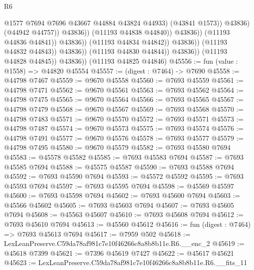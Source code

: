 \begin{lexlean}{R6}
\begin{coremodule}
                                                    @1577
                                                    @7694
                                                    @7696
                                                    @43667
                                                    @44884
                                                    @43824
                                                    @44933)
                                                  (@43841 @1573))
                                                @43836)
                                              (@44942 @44757))
                                            @43836))
                                        (@11193 @44838 @44840))
                                      @43836))
                                  (@11193 @44836 @44841))
                                @43836))
                            (@11193 @44834 @44842))
                          @43836))
                      (@11193 @44832 @44843))
                    @43836))
                (@11193 @44830 @44844))
              @43836))
          (@11193 @44828 @44845))
        @43836))
    (@11193 @44825 @44846)
@45556 := fun (value : @1558) => @44820 @45554
@45557 := (digest : @7464) -> @7690
@45558 := @44798 @7467
@45559 := @9670 @45558
@45560 := @7693 @45559
@45561 := @44798 @7471
@45562 := @9670 @45561
@45563 := @7693 @45562
@45564 := @44798 @7475
@45565 := @9670 @45564
@45566 := @7693 @45565
@45567 := @44798 @7479
@45568 := @9670 @45567
@45569 := @7693 @45568
@45570 := @44798 @7483
@45571 := @9670 @45570
@45572 := @7693 @45571
@45573 := @44798 @7487
@45574 := @9670 @45573
@45575 := @7693 @45574
@45576 := @44798 @7491
@45577 := @9670 @45576
@45578 := @7693 @45577
@45579 := @44798 @7495
@45580 := @9670 @45579
@45582 := @7693 @45580 @7694
@45583 := @45578 @45582
@45585 := @7693 @45583 @7694
@45587 := @7693 @45585 @7694
@45588 := @45575 @45587
@45590 := @7693 @45588 @7694
@45592 := @7693 @45590 @7694
@45593 := @45572 @45592
@45595 := @7693 @45593 @7694
@45597 := @7693 @45595 @7694
@45598 := @45569 @45597
@45600 := @7693 @45598 @7694
@45602 := @7693 @45600 @7694
@45603 := @45566 @45602
@45605 := @7693 @45603 @7694
@45607 := @7693 @45605 @7694
@45608 := @45563 @45607
@45610 := @7693 @45608 @7694
@45612 := @7693 @45610 @7694
@45613 := @45560 @45612
@45616 := fun (digest : @7464) => @7693 @45613 @7694
@45617 := @7959 @502
@45618 := LexLeanPreserve.C59da78af981c7e10f46266c8a8b8b11e.R6.__enc_2
@45619 := @45618 @7399
@45621 := @7396 @45619 @7427
@45622 := @45617 @45621
@45623 := LexLeanPreserve.C59da78af981c7e10f46266c8a8b8b11e.R6.__fits_11

\end{coremodule}
\end{lexlean}
